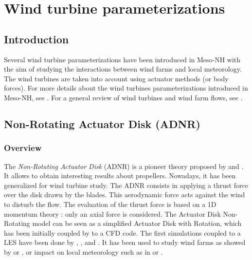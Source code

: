 
\chapter{Wind turbine parameterizations}
\minitoc

\section{Introduction}

Several wind turbine parameterizations have been introduced in Meso-NH with the aim of studying the interactions between wind farms and local meteorology. The wind turbines are taken into account using actuator methods (or body forces). For more details about the wind turbines parameterizations introduced in Meso-NH, see \cite{joulin2019modelisation}. For a general review of wind turbines and wind farm flows, see \cite{porte2020wind}.

\section{Non-Rotating Actuator Disk (ADNR)}

\subsection{Overview}
The \textit{Non-Rotating Actuator Disk} (ADNR) is a pioneer theory proposed by \cite{rankine1865mechanical} and \cite{froude1889part}. It allows to obtain interesting results about propellers. Nowadays, it has been generalized for wind turbine study.
\medbreak
The ADNR consists in applying a thrust force over the disk drawn by the blades. This aerodynamic force acts against the wind to disturb the flow. The evaluation of the thrust force is based on a 1D momentum theory : only an axial force is considered. The Actuator Disk Non-Rotating model can be seen as a simplified Actuator Disk with Rotation, which has been initially coupled  by \cite{sorensen1992unsteady} to a CFD code.
\medbreak
The first simulations coupled to a LES have been done by \cite{jimenez2007advances}, \cite{jimenez2008large}, and \cite{wu2011large}. It has been used to study wind farms as showed by \cite{wu2015modeling} or \cite{shamsoddin2017large}, or impact on local meteorology such as in \cite{calaf2010large} or \cite{calaf2011large}.

